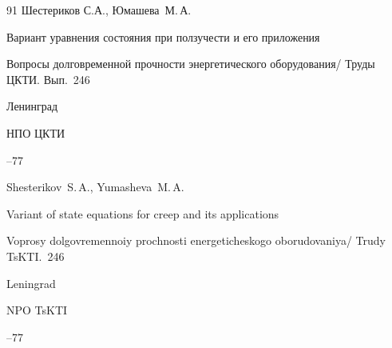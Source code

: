 \begin{thebibliography}{91}
\by Шестериков С.А.,  Юмашева~М.\,А.

\paper Вариант уравнения состояния при ползучести и его приложения

\inbook Вопросы долговременной прочности энергетического оборудования\rm / Труды ЦКТИ. Вып.~246

\publaddr Ленинград

\publ НПО ЦКТИ


--77

\misctransl

\by Shesterikov~S.\,A., Yumasheva~M.\,A.

\paper Variant of state equations for creep and its applications

\inbook Voprosy dolgovremennoiy prochnosti energeticheskogo oborudovaniya\rm / Trudy TsKTI.~246


\publaddr Leningrad

\publ NPO TsKTI


--77



\end{thebibliography}

\noindent

\hskip6.5cm \thedate \par\noindent

\hskip6.5cm\therevdate








%





\makeengtitlem



 \newpage

%


%

%

